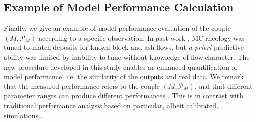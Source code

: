\documentclass{article}
\begin{document}
\subsection{Example of Model Performance Calculation}
Finally, we give an example of model performance evaluation of the couple $\left(M, \mathcal P_M\right)$ according to a specific observation. In past work \citep{Patra2005}, MC rheology was tuned to match deposits for known block and ash flows, but {\it a priori} predictive ability was limited by inability to tune without knowledge of flow character. The new procedure developed in this study enables an enhanced quantification of model performance, i.e. the similarity of the outputs and real data. We remark that the measured performance refers to the couple $\left(M, \mathcal P_M\right)$, and that different parameter ranges can produce different performances \citep{Tierz2016, Sandri2018}. This is in contrast with traditional performance analysis based on particular, albeit calibrated, simulations \citep{Charbonnier2012}.
\end{document}
